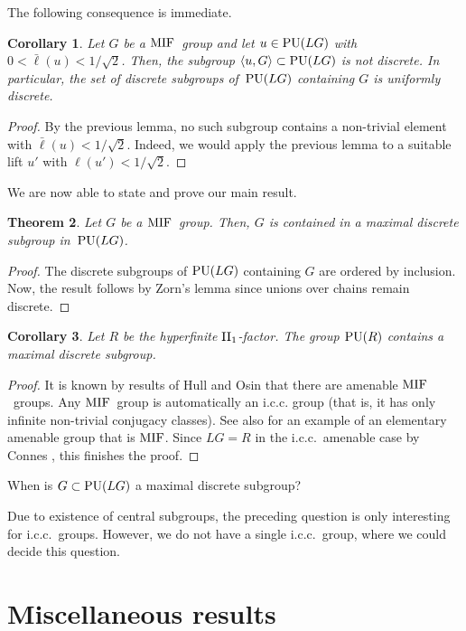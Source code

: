 \documentclass[pdftex]{sigma}
\numberwithin{equation}{section}
\newtheorem{Theorem}{Theorem}[section]
\newtheorem{Corollary}[Theorem]{Corollary}
\begin{document}
The following consequence is immediate.
\begin{Corollary}
Let $G$ be a ${\rm MIF}$~group and let $u \in {\rm PU}(LG)$ with $0 < \bar \ell(u) < 1/\sqrt{2}$. Then, the subgroup $\langle u, G \rangle \subset {\rm PU}(LG)$ is not discrete.
In particular, the set of discrete subgroups of~${\rm PU}(LG)$ containing $G$ is uniformly discrete.
\end{Corollary}
\begin{proof} By the previous lemma, no such subgroup contains a non-trivial element with $\bar \ell(u)<1/\sqrt{2}$. Indeed, we would apply the previous lemma to a suitable lift $u'$ with $\ell(u')< 1/\sqrt{2}$.\end{proof}

We are now able to state and prove our main result.
\begin{Theorem} %
Let $G$ be a ${\rm MIF}$~group. Then, $G$ is contained in a maximal discrete subgroup in~${\rm PU}(LG)$.
\end{Theorem}
\begin{proof}
The discrete subgroups of ${\rm PU}(LG)$ containing $G$ are ordered by inclusion. Now, the result follows by Zorn's lemma since unions over chains remain discrete.
\end{proof}

\begin{Corollary}
Let $R$ be the hyperfinite ${\rm II}_1$-factor. The group ${\rm PU}(R)$ contains a maximal discrete subgroup.
\end{Corollary}
\begin{proof}
It is known by results of Hull and Osin \cite{MR3556970} that there are amenable ${\rm MIF}$~groups. Any ${\rm MIF}$~group is automatically an i.c.c. group (that is, it has only infinite non-trivial conjugacy classes). See also \cite{MR4193626} for an example of an elementary amenable group that is ${\rm MIF}$. Since $LG=R$ in the i.c.c.\ amenable case by Connes \cite{MR454659}, this finishes the proof.
\end{proof}

\begin{Question}
When is $G \subset {\rm PU}(LG)$ a maximal discrete subgroup?
\end{Question}

Due to existence of central subgroups, the preceding question is only interesting for i.c.c.\ groups. However, we do not have a single i.c.c.\ group, where we could decide this question.

\section{Miscellaneous results}
\end{document}
